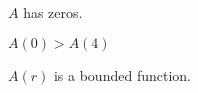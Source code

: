 \documentclass{ximera}
\begin{document}
\begin{exercise}
\begin{question} 



$A$ has  zeros.

\end{question}








\begin{question} 



$A(0) > A(4)$ 
\begin{multipleChoice}
\end{multipleChoice}

\end{question}








\begin{question} 



$A(r)$ is a bounded function.
\begin{multipleChoice}
\end{multipleChoice}

\end{question}















\end{exercise}
\end{document}
